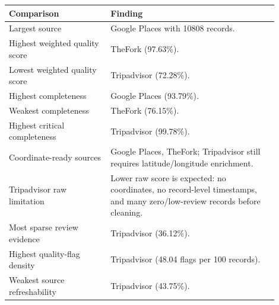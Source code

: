 {\small
\begin{tabular}{p{0.34\linewidth}p{0.56\linewidth}}
\toprule
Comparison & Finding \\
\midrule
Largest source & Google Places with 10808 records. \\
Highest weighted quality score & TheFork (97.63\%). \\
Lowest weighted quality score & Tripadvisor (72.28\%). \\
Highest completeness & Google Places (93.79\%). \\
Weakest completeness & TheFork (76.15\%). \\
Highest critical completeness & Tripadvisor (99.78\%). \\
Coordinate-ready sources & Google Places, TheFork; Tripadvisor still requires latitude/longitude enrichment. \\
Tripadvisor raw limitation & Lower raw score is expected: no coordinates, no record-level timestamps, and many zero/low-review records before cleaning. \\
Most sparse review evidence & Tripadvisor (36.12\%). \\
Highest quality-flag density & Tripadvisor (48.04 flags per 100 records). \\
Weakest source refreshability & Tripadvisor (43.75\%). \\
\bottomrule
\end{tabular}
}
